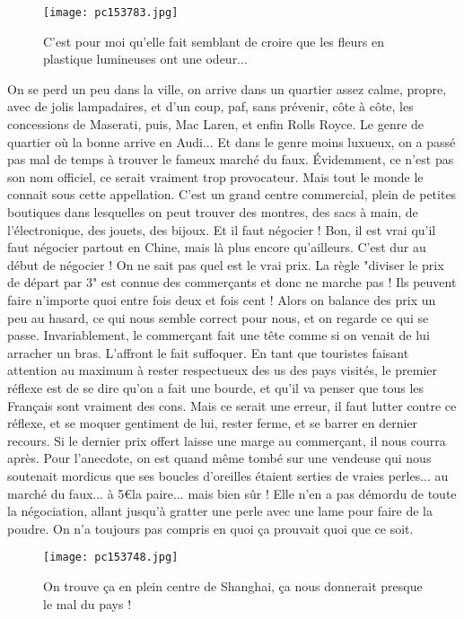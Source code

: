 \documentclass{book}
\begin{document}
\begin{figure}[h]
\centering
\texttt{[image: pc153783.jpg]}
\caption*{C'est pour moi qu'elle fait semblant de croire que les fleurs en plastique lumineuses ont une odeur...}
\end{figure}

On se perd un peu dans la ville, on arrive dans un quartier assez calme, propre, avec de jolis lampadaires, et d'un coup, paf, sans prévenir, côte à côte, les concessions de Maserati, puis, Mac Laren, et enfin Rolls Royce. Le genre de quartier où la bonne arrive en Audi... Et dans le genre moins luxueux, on a passé pas mal de temps à trouver le fameux marché du faux. Évidemment, ce n'est pas son nom officiel, ce serait vraiment trop provocateur. Mais tout le monde le connait sous cette appellation. C'est un grand centre commercial, plein de petites boutiques dans lesquelles on peut trouver des montres, des sacs à main, de l'électronique, des jouets, des bijoux. Et il faut négocier ! Bon, il est vrai qu'il faut négocier partout en Chine, mais là plus encore qu'ailleurs. C'est dur au début de négocier ! On ne sait pas quel est le vrai prix. La règle "diviser le prix de départ par 3" est connue des commerçants et donc ne marche pas ! Ils peuvent faire n'importe quoi entre fois deux et fois cent ! Alors on balance des prix un peu au hasard, ce qui nous semble correct pour nous, et on regarde ce qui se passe. Invariablement, le commerçant fait une tête comme si on venait de lui arracher un bras. L'affront le fait suffoquer. En tant que touristes faisant attention au maximum à rester respectueux des us des pays visités, le premier réflexe est de se dire qu'on a fait une bourde, et qu'il va penser que tous les Français sont vraiment des cons. Mais ce serait une erreur, il faut lutter contre ce réflexe, et se moquer gentiment de lui, rester ferme, et se barrer en dernier recours. Si le dernier prix offert laisse une marge au commerçant, il nous courra après. Pour l'anecdote, on est quand même tombé sur une vendeuse qui nous soutenait mordicus que ses boucles d'oreilles étaient serties de vraies perles... au marché du faux... à 5\euro la paire... mais bien sûr ! Elle n'en a pas démordu de toute la négociation, allant jusqu'à gratter une perle avec une lame pour faire de la poudre. On n'a toujours pas compris en quoi ça prouvait quoi que ce soit.


\begin{figure}[h]
\centering
\texttt{[image: pc153748.jpg]}
\caption*{On trouve ça en plein centre de Shanghai, ça nous donnerait presque le mal du pays !}
\end{figure}
\end{document}
